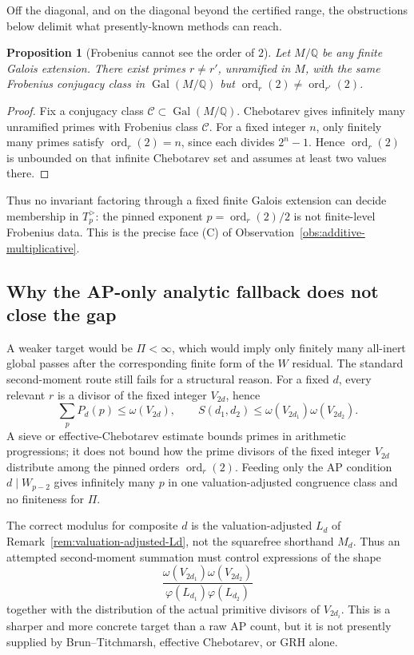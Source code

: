 \documentclass[11pt]{amsart}
\theoremstyle{plain}
\newtheorem{proposition}[theorem]{Proposition}
\theoremstyle{definition}
\theoremstyle{remark}
\numberwithin{equation}{section}
\newcommand{\ord}{\operatorname{ord}}
\newcommand{\Gal}{\operatorname{Gal}}
\newcommand{\Q}{\mathbb{Q}}
\begin{document}
Off the diagonal, and on the diagonal beyond the certified range, the obstructions below delimit what presently-known methods can reach.

\begin{proposition}[Frobenius cannot see the order of $2$]\label{prop:frobenius-blind}
Let $M/\Q$ be any finite Galois extension. There exist primes $r\neq r'$, unramified in $M$, with the same Frobenius conjugacy class in $\Gal(M/\Q)$ but $\ord_r(2)\neq\ord_{r'}(2)$.
\end{proposition}

\begin{proof}
Fix a conjugacy class $\mathcal C\subset\Gal(M/\Q)$. Chebotarev gives infinitely many unramified primes with Frobenius class $\mathcal C$. For a fixed integer $n$, only finitely many primes satisfy $\ord_r(2)=n$, since each divides $2^n-1$. Hence $\ord_r(2)$ is unbounded on that infinite Chebotarev set and assumes at least two values there.
\end{proof}

Thus no invariant factoring through a fixed finite Galois extension can decide membership in $T_p^{>}$: the pinned exponent $p=\ord_r(2)/2$ is not finite-level Frobenius data. This is the precise face (C) of Observation~\ref{obs:additive-multiplicative}.

\subsection{Why the AP-only analytic fallback does not close the gap}\label{sec:weaker-blocked}

A weaker target would be $\Pi<\infty$, which would imply only finitely many all-inert global passes after the corresponding finite form of the $W$ residual. The standard second-moment route still fails for a structural reason. For a fixed $d$, every relevant $r$ is a divisor of the fixed integer $V_{2d}$, hence
\[
  \sum_p P_d(p)\leq \omega(V_{2d}),\qquad
  S(d_1,d_2)\leq \omega(V_{2d_1})\omega(V_{2d_2}).
\]
A sieve or effective-Chebotarev estimate bounds primes in arithmetic progressions; it does not bound how the prime divisors of the fixed integer $V_{2d}$ distribute among the pinned orders $\ord_r(2)$. Feeding only the AP condition $d\mid W_{p-2}$ gives infinitely many $p$ in one valuation-adjusted congruence class and no finiteness for $\Pi$.

The correct modulus for composite $d$ is the valuation-adjusted $L_d$ of Remark~\ref{rem:valuation-adjusted-Ld}, not the squarefree shorthand $M_d$. Thus an attempted second-moment summation must control expressions of the shape
\[
  \frac{\omega(V_{2d_1})\omega(V_{2d_2})}
       {\varphi(L_{d_1})\varphi(L_{d_2})}
\]
together with the distribution of the actual primitive divisors of $V_{2d_i}$. This is a sharper and more concrete target than a raw AP count, but it is not presently supplied by Brun--Titchmarsh, effective Chebotarev, or GRH alone.
\end{document}
